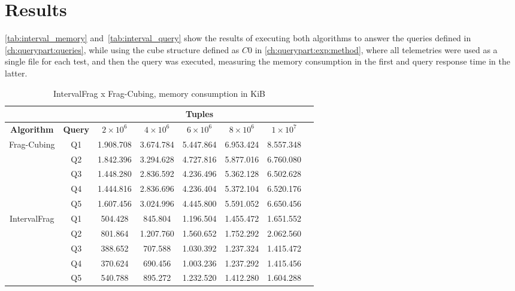 \section{Results}\label{ch:interval:results}

\autoref{tab:interval_memory} and~\autoref{tab:interval_query} show the results of executing both algorithms to answer the queries defined in \autoref{ch:querypart:queries}, while using the cube structure defined as $C0$ in \autoref{ch:querypart:exp:method}, where all telemetries were used as a single file for each test, and then the query was executed, measuring the memory consumption in the first and query response time in the latter.

\begin{table}[!ht]
  \centering
  \caption{IntervalFrag x Frag-Cubing, memory consumption in KiB}\label{tab:interval_memory}
  \begin{tabular}{|c|c|c|c|c|c|c|c|}
    \hline
    & & \multicolumn{5}{c|}{\textbf{Tuples}} \\
    \hline
    \bfseries Algorithm & \bfseries Query & \bfseries $2\times10^6$ & \bfseries $4\times10^6$ & \bfseries $6\times10^6$ & \bfseries $8\times10^6$ & \bfseries $1\times10^7$\\
    \hline
    \multirow{5}{*}{Frag-Cubing} & Q1 &
    1.908.708 & 3.674.784 & 5.447.864 & 6.953.424 & 8.557.348
    \\\cline{2-7} & Q2 &
    1.842.396 & 3.294.628 & 4.727.816 & 5.877.016 & 6.760.080
    \\\cline{2-7} & Q3 &
    1.448.280 & 2.836.592 & 4.236.496 & 5.362.128 & 6.502.628
    \\\cline{2-7} & Q4 &
    1.444.816 & 2.836.696 & 4.236.404 & 5.372.104 & 6.520.176
    \\\cline{2-7} & Q5 &
    1.607.456 & 3.024.996 & 4.445.800 & 5.591.052 & 6.650.456
    \\\hline
    \multirow{5}{*}{IntervalFrag} & Q1 &
    504.428 & 845.804 & 1.196.504 & 1.455.472 & 1.651.552
    \\\cline{2-7}
    & Q2 &
    801.864 & 1.207.760 & 1.560.652 & 1.752.292 & 2.062.560
    \\\cline{2-7} & Q3 &
    388.652 & 707.588 & 1.030.392 & 1.237.324 & 1.415.472
    \\\cline{2-7}
    & Q4 &
    370.624 & 690.456 & 1.003.236 & 1.237.292 & 1.415.456
    \\\cline{2-7}
    & Q5 &
    540.788 & 895.272 & 1.232.520 & 1.412.280 & 1.604.288
    \\\hline
  \end{tabular}
\end{table}

